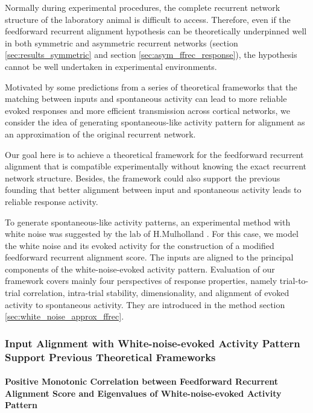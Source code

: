 \documentclass[11pt]{article}
\begin{document}
	Normally during experimental procedures, the complete recurrent network structure of the laboratory animal is difficult to access. Therefore, even if the feedforward recurrent alignment hypothesis can be theoretically underpinned well in both symmetric and asymmetric recurrent networks (section \ref{sec:results_symmetric} and section \ref{sec:asym_ffrec_response}), the hypothesis cannot be well undertaken in experimental environments. 
	
	Motivated by some predictions from a series of theoretical frameworks \cite{mulholland2023selective, marre2009reliable} that the matching between inputs and spontaneous activity can lead to more reliable evoked responses and more efficient transmission across cortical networks, we consider the idea of generating spontaneous-like activity pattern for alignment as an approximation of the original recurrent network. 
	
	Our goal here is to achieve a theoretical framework for the feedforward recurrent alignment that is compatible experimentally without knowing the exact recurrent network structure. Besides, the framework could also support the previous founding that better alignment between input and spontaneous activity leads to reliable response activity. 
	
	To generate spontaneous-like activity patterns, an experimental method with white noise was suggested by the lab of H.Mulholland \cite{cosyne2023}.  %
	For this case, we model the white noise and its evoked activity for the construction of a modified feedforward recurrent alignment score. The inputs are aligned to the principal components of the white-noise-evoked activity pattern. Evaluation of our framework covers mainly four perspectives of response properties, namely trial-to-trial correlation, intra-trial stability, dimensionality, and alignment of evoked activity to spontaneous activity. They are introduced in the method section \ref{sec:white_noise_approx_ffrec}. 

	\subsubsection{Input Alignment with White-noise-evoked Activity Pattern Support Previous Theoretical Frameworks}

	\paragraph{Positive Monotonic Correlation between Feedforward Recurrent Alignment Score and Eigenvalues of White-noise-evoked Activity Pattern}\mbox{}\\
	
\end{document}
